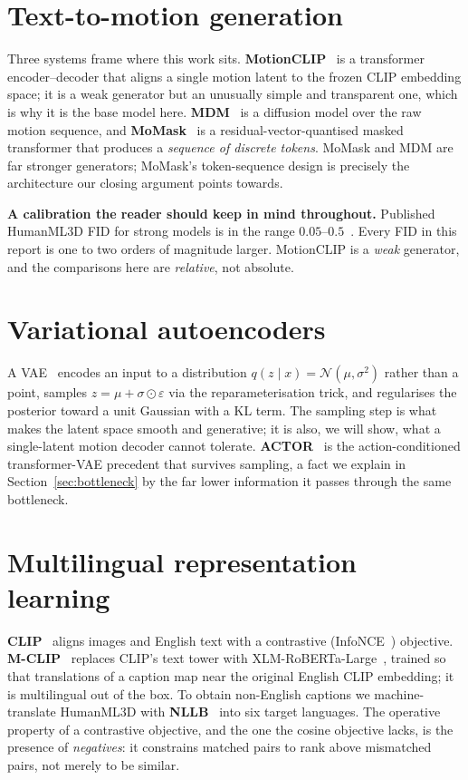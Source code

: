 \documentclass[11pt,a4paper]{report}
\newcommand{\callout}[1]{\begin{calloutenv}\small #1\end{calloutenv}}
\begin{document}
\section{Text-to-motion generation}

Three systems frame where this work sits.
\textbf{MotionCLIP}~\cite{tevet2022motionclip} is a transformer
encoder--decoder that aligns a single motion latent to the frozen CLIP
embedding space; it is a weak generator but an unusually simple and
transparent one, which is why it is the base model here.
\textbf{MDM}~\cite{tevet2023mdm} is a diffusion model over the raw motion
sequence, and \textbf{MoMask}~\cite{guo2024momask} is a
residual-vector-quantised masked transformer that produces a \emph{sequence
of discrete tokens}. MoMask and MDM are far stronger generators; MoMask's
token-sequence design is precisely the architecture our closing argument
points towards.

\callout{\textbf{A calibration the reader should keep in mind throughout.}
Published HumanML3D FID for strong models is in the range
$0.05$--$0.5$~\cite{guo2024momask}. Every FID in this report is one to two
orders of magnitude larger. MotionCLIP is a \emph{weak} generator, and the
comparisons here are \emph{relative}, not absolute.}

\section{Variational autoencoders}

A VAE~\cite{kingma2014vae} encodes an input to a distribution
$q(z\mid x)=\mathcal N(\mu,\sigma^2)$ rather than a point, samples
$z=\mu+\sigma\odot\varepsilon$ via the reparameterisation trick, and
regularises the posterior toward a unit Gaussian with a KL term. The
sampling step is what makes the latent space smooth and generative; it is
also, we will show, what a single-latent motion decoder cannot tolerate.
\textbf{ACTOR}~\cite{petrovich2021actor} is the action-conditioned
transformer-VAE precedent that survives sampling, a fact we explain in
Section~\ref{sec:bottleneck} by the far lower information it passes through
the same bottleneck.

\section{Multilingual representation learning}

\textbf{CLIP}~\cite{radford2021clip} aligns images and English text with a
contrastive (InfoNCE~\cite{oord2018infonce}) objective.
\textbf{M-CLIP}~\cite{carlsson2022mclip} replaces CLIP's text tower with
XLM-RoBERTa-Large~\cite{conneau2020xlmr}, trained so that translations of a
caption map near the original English CLIP embedding; it is multilingual
out of the box. To obtain non-English captions we machine-translate
HumanML3D with \textbf{NLLB}~\cite{nllb2022} into six target languages. The
operative property of a contrastive objective, and the one the cosine
objective lacks, is the presence of \emph{negatives}: it constrains matched
pairs to rank above mismatched pairs, not merely to be similar.
\end{document}
